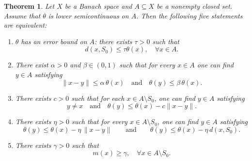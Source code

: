 \documentclass[11pt]{article}
\newtheorem{theorem}{Theorem}[section]
\begin{document}
\begin{theorem}  \label{TTWCJK}  Let $X$   be a Banach space  and $A \subseteq X$ be a nonempty closed   set. Assume that $\theta$ is lower semicontinuous on $A$. Then   the following five statements are equivalent:
	\begin{enumerate}
		\item[(i)] $\theta$ has an error bound on $A$: there exists $\tau>0$ such that
		\begin{equation}\label{EBAQJ} 
			d(x,S_0)\le\tau \theta(x), \quad  \forall x\in A.
		\end{equation}		
		\item[(ii)]  There exist  \(\alpha > 0\) and \(\beta \in (0,1)\) such that for every \(x \in A\) one can find \(y \in A\) satisfying
		\begin{equation}\label{EYZXJ} 
			\|x - y\| \le \alpha\,\theta(x) \quad\text{and}\quad \theta(y) \le \beta\,\theta(x).
		\end{equation}	
		\item[(iii)] There exists   \(c>0\) such that for each \(x\in A\setminus S_0\), one can find \(y\in A\) satisfying
		\begin{equation}\label{EevL}
			y\neq x \quad\text{and}\quad
			\theta(y)\le \theta(x)-c\|x-y\| .
		\end{equation}
		\item[(iv)]   There exists   \(\eta>0\) such that for every \(x\in A\setminus S_0\), one can find  \(y\in A\) satisfying
		\[
		\theta(y) \le \theta(x) - \eta\,\|x-y\| \qquad\text{and}\qquad \theta(y) \le \theta(x) - \eta\,d(x,S_0).
		\]
		\item[(v)]   There exists   \(\gamma >0\) such that
		\[
		m(x)\ge \gamma,\quad\forall x\in A\setminus S_0.
		\]
	\end{enumerate}
\end{theorem}
\end{document}
